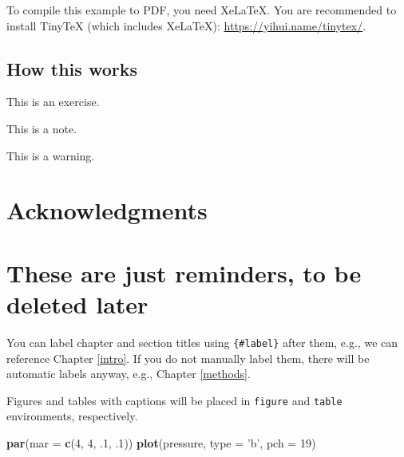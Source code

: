 \documentclass[12pt,]{book}
\newenvironment{Shaded}{\begin{snugshade}}{\end{snugshade}}
\newcommand{\DataTypeTok}[1]{\textcolor[rgb]{0.13,0.29,0.53}{#1}}
\newcommand{\DecValTok}[1]{\textcolor[rgb]{0.00,0.00,0.81}{#1}}
\newcommand{\FloatTok}[1]{\textcolor[rgb]{0.00,0.00,0.81}{#1}}
\newcommand{\KeywordTok}[1]{\textcolor[rgb]{0.13,0.29,0.53}{\textbf{#1}}}
\newcommand{\NormalTok}[1]{#1}
\newcommand{\StringTok}[1]{\textcolor[rgb]{0.31,0.60,0.02}{#1}}
\let\BeginKnitrBlock\begin \let\EndKnitrBlock\end
\begin{document}
To compile this example to PDF, you need XeLaTeX. You are recommended to install TinyTeX (which includes XeLaTeX): \url{https://yihui.name/tinytex/}.

\hypertarget{how-this-works}{%
\subsection*{How this works}\label{how-this-works}}

\BeginKnitrBlock{rmdexercise}
This is an exercise.
\EndKnitrBlock{rmdexercise}

\BeginKnitrBlock{rmdnote}
This is a note.
\EndKnitrBlock{rmdnote}

\BeginKnitrBlock{rmdwarning}
This is a warning.
\EndKnitrBlock{rmdwarning}

\hypertarget{acknowledgments}{%
\section*{Acknowledgments}\label{acknowledgments}}

\hypertarget{these-are-just-reminders-to-be-deleted-later}{%
\section*{These are just reminders, to be deleted later}\label{these-are-just-reminders-to-be-deleted-later}}

You can label chapter and section titles using \texttt{\{\#label\}} after them, e.g., we can reference Chapter \ref{intro}. If you do not manually label them, there will be automatic labels anyway, e.g., Chapter \ref{methods}.

Figures and tables with captions will be placed in \texttt{figure} and \texttt{table} environments, respectively.

\begin{Shaded}
\begin{Highlighting}[]
\KeywordTok{par}\NormalTok{(}\DataTypeTok{mar =} \KeywordTok{c}\NormalTok{(}\DecValTok{4}\NormalTok{, }\DecValTok{4}\NormalTok{, }\FloatTok{.1}\NormalTok{, }\FloatTok{.1}\NormalTok{))}
\KeywordTok{plot}\NormalTok{(pressure, }\DataTypeTok{type =} \StringTok{'b'}\NormalTok{, }\DataTypeTok{pch =} \DecValTok{19}\NormalTok{)}
\end{Highlighting}
\end{Shaded}
\end{document}
